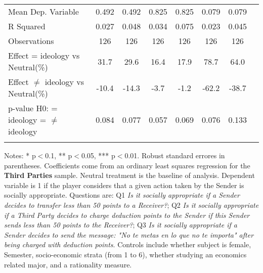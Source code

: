 \begin{table}[H]
{\begin{threeparttable}
\begin{tabular}{lccccccc}
\midrule
Mean Dep. Variable  &       0.492         &       0.492         &       0.825         &       0.825         &       0.079         &       0.079         \\
R Squared           &       0.027         &       0.048         &       0.034         &       0.075         &       0.023         &       0.045         \\
Observations        &         126         &         126         &         126         &         126         &         126         &         126         \\
\midrule
Effect = ideology vs Neutral(\%)&        31.7         &        29.6         &        16.4         &        17.9         &        78.7         &        64.0         \\
Effect $\neq$ ideology vs Neutral(\%)&       -10.4         &       -14.3         &        -3.7         &        -1.2         &       -62.2         &       -38.7         \\
p-value H0: = ideology = $\neq$ ideology&       0.084         &       0.077         &       0.057         &       0.069         &       0.076         &       0.133         \\
\bottomrule[0.5pt]
\label{tab:table2}
\end{tabular}
\vspace{-13pt}
\begin{tablenotes}[flushleft]{\setlength{\itemindent}{-3pt}}
\small
\item
Notes:
*
p$<$0.1,
**
p$<$0.05,
***
p$<$0.01.
Robust
standard
errores
in
parentheses.
Coefficients
come
from
an
ordinary
least
squares
regression
for
the
\textbf{Third
Parties}
sample.
Neutral
treatment
is
the
baseline
of
analysis.
Dependent
variable
is
1
if
the
player
considers
that
a
given
action
taken
by
the
Sender
is
socially
appropriate.
Questions
are:
Q1
\textit{Is
it
socially
appropriate
if
a
Sender
decides
to
transfer
less
than
50
points
to
a
Receiver?};
Q2
\textit{Is
it
socially
appropriate
if
a
Third
Party
decides
to
charge
deduction
points
to
the
Sender
if
this
Sender
sends
less
than
50
points
to
the
Receiver?};
Q3
\textit{Is
it
socially
appropriate
if
a
Sender
decides
to
send
the
message:
\textit{"No
te
metas
en
lo
que
no
te
importa"}
after
being
charged
with
deduction
points}.
Controls
include
whether
subject
is
female,
Semester,
socio-economic
strata
(from
1
to
6),
whether
studying
an
economics
related
major,
and
a
rationality
measure.
\end{tablenotes}
\end{threeparttable}
}
\end{table}
